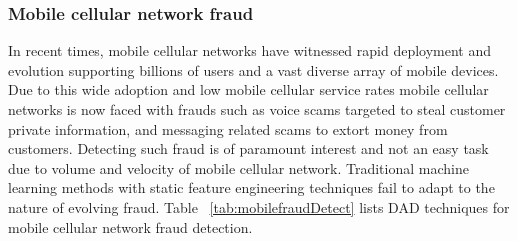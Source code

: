 \subsubsection{Mobile cellular network fraud}
\label{sec:mobilefraud}

In recent times, mobile cellular networks  have witnessed  rapid deployment and evolution
supporting billions of users and a vast diverse array of mobile devices.
Due to this wide adoption and low mobile cellular service rates mobile
cellular networks is now faced with frauds such as voice scams targeted to steal customer private information, and messaging related scams to extort money from customers. Detecting such fraud is of paramount interest and not an easy task due to volume and velocity of mobile cellular network.
Traditional machine learning methods with static feature engineering  techniques fail to adapt to the nature of evolving fraud.
Table ~\ref{tab:mobilefraudDetect} lists DAD techniques for mobile cellular network fraud detection.

\begin{table}
\begin{center}
  \caption{Examples of DAD techniques used in  mobile cellular network fraud detection.
          \\CNN:  convolution neural networks,DBN: Deep Belief Networks
          \\SAE: Stacked Autoencoders, DNN : Deep neural networks
          \\GAN: Generative Adversarial Networks }
  \captionsetup{justification=centering}
  \label{tab:mobilefraudDetect}
\end{center}
\end{table}
